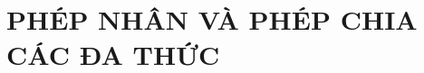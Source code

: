 \documentclass[12pt,a4paper,oneside]{book}
\theoremstyle{explain}
\theoremstyle{nonumberplain}
\begin{document}
	\tableofcontents
	\chapter{PHÉP NHÂN VÀ PHÉP CHIA CÁC ĐA THỨC}
	
	
	
	
	
	
	
	
	
	
	
	
	
\end{document}
